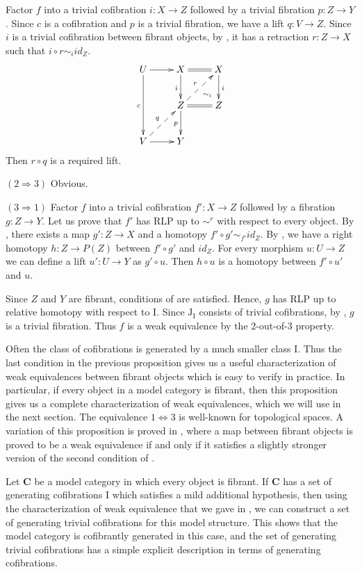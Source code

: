 \documentclass{tac}
\theoremstyle{definition}
\newcommand{\cat}[1]{\mathbf{#1}}
\newcommand{\C}{\cat{C}}
\newcommand{\I}{\mathrm{I}}
\newcommand{\J}{\mathrm{J}}
\begin{document}
Factor $f$ into a trivial cofibration $i : X \to Z$ followed by a trivial fibration $p : Z \to Y$.
Since $c$ is a cofibration and $p$ is a trivial fibration, we have a lift $q : V \to Z$.
Since $i$ is a trivial cofibration between fibrant objects, by , it has a retraction $r : Z \to X$ such that $i \circ r \sim_i id_Z$.
\[ \xymatrix{ U \ar[r] \ar[dd]_c        & X \ar[d]_i \ar@{=}[r] \ar@{}[dr]|(.7){\sim_i} & X \ar[d]^i \\
                                        & Z \ar[d]_p \ar@{=}[r] \ar@{-->}[ur]^r         & Z          \\
              V \ar[r] \ar@{-->}[ur]^q  & Y                                             &
            } \]
Then $r \circ q$ is a required lift.

$(2 \Rightarrow 3)$ Obvious.

$(3 \Rightarrow 1)$
Factor $f$ into a trivial cofibration $f' : X \to Z$ followed by a fibration $g : Z \to Y$.
Let us prove that $f'$ has RLP up to $\sim^r$ with respect to every object.
By , there exists a map $g' : Z \to X$ and a homotopy $f' \circ g' \sim_{f'} id_Z$.
By , we have a right homotopy $h : Z \to P(Z)$ between $f' \circ g'$ and $id_Z$.
For every morphism $u : U \to Z$ we can define a lift $u' : U \to Y$ as $g' \circ u$.
Then $h \circ u$ is a homotopy between $f' \circ u'$ and $u$.

Since $Z$ and $Y$ are fibrant, conditions of  are satisfied.
Hence, $g$ has RLP up to relative homotopy with respect to $\I$.
Since $\J_\I$ consists of trivial cofibrations, by , $g$ is a trivial fibration.
Thus $f$ is a weak equivalence by the 2-out-of-3 property.
\endproof

Often the class of cofibrations is generated by a much smaller class $\I$.
Thus the last condition in the previous proposition gives us a useful characterization of weak equivalences between fibrant objects which is easy to verify in practice.
In particular, if every object in a model category is fibrant, then this proposition gives us a complete characterization of weak equivalences, which we will use in the next section.
The equivalence $1 \Leftrightarrow 3$ is well-known for topological spaces.
A variation of this proposition is proved in \cite{vogt-we},
where a map between fibrant objects is proved to be a weak equivalence if and only if it satisfies a slightly stronger version of the second condition of .

Let $\C$ be a model category in which every object is fibrant.
If $\C$ has a set of generating cofibrations $\I$ which satisfies a mild additional hypothesis, then using the characterization of weak equivalence that we gave in ,
we can construct a set of generating trivial cofibrations for this model structure.
This shows that the model category is cofibrantly generated in this case,
and the set of generating trivial cofibrations has a simple explicit description in terms of generating cofibrations.
\end{document}
